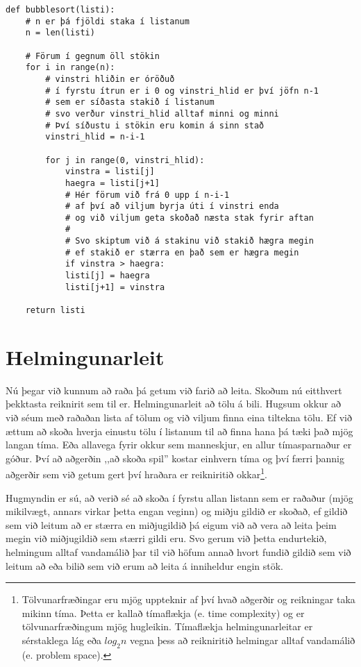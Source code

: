 \begin{lstlisting}[caption=Bubble sort reikniritið, label=lst:reiknirit-bubble]
	def bubblesort(listi):
	# n er þá fjöldi staka í listanum
	n = len(listi)
	
	# Förum í gegnum öll stökin
	for i in range(n):
		# vinstri hliðin er óröðuð 
		# í fyrstu ítrun er i 0 og vinstri_hlid er því jöfn n-1
		# sem er síðasta stakið í listanum
		# svo verður vinstri_hlid alltaf minni og minni
		# Því síðustu i stökin eru komin á sinn stað
		vinstri_hlid = n-i-1
		
		for j in range(0, vinstri_hlid):
			vinstra = listi[j]
			haegra = listi[j+1]
			# Hér förum við frá 0 upp í n-i-1
			# af því að viljum byrja úti í vinstri enda 
			# og við viljum geta skoðað næsta stak fyrir aftan
			# 
			# Svo skiptum við á stakinu við stakið hægra megin
			# ef stakið er stærra en það sem er hægra megin
			if vinstra > haegra:
			listi[j] = haegra
			listi[j+1] = vinstra
		
	return listi
\end{lstlisting}



\section{Helmingunarleit}\label{uk:reiknirit-helmingunarleit}
Nú þegar við kunnum að raða þá getum við farið að leita.
Skoðum nú eitthvert þekktasta reiknirit sem til er. 
Helmingunarleit að tölu á bili. 
Hugsum okkur að við séum með raðaðan lista af tölum og við viljum finna eina tiltekna tölu. 
Ef við ættum að skoða hverja einustu tölu í listanum til að finna hana þá tæki það mjög langan tíma.
Eða allavega fyrir okkur sem manneskjur, en allur tímasparnaður er góður.
Því að aðgerðin ,,að skoða spil'' kostar einhvern tíma og því færri þannig aðgerðir sem við getum gert því hraðara er reikniritið okkar\footnote{Tölvunarfræðingar eru mjög uppteknir af því hvað aðgerðir og reikningar taka mikinn tíma.
	Þetta er kallað tímaflækja (e. time complexity) og er tölvunarfræðingum mjög hugleikin.
	Tímaflækja helmingunarleitar er sérstaklega lág eða $log_2{n}$ vegna þess að reikniritið helmingar alltaf vandamálið (e. problem space).}.

Hugmyndin er sú, að verið sé að skoða í fyrstu allan listann sem er raðaður (mjög mikilvægt, annars virkar þetta engan veginn) og miðju gildið er skoðað, ef gildið sem við leitum að er stærra en miðjugildið þá eigum við að vera að leita þeim megin við miðjugildið sem stærri gildi eru.
Svo gerum við þetta endurtekið, helmingum alltaf vandamálið þar til við höfum annað hvort fundið gildið sem við leitum að eða bilið sem við erum að leita á inniheldur engin stök.


